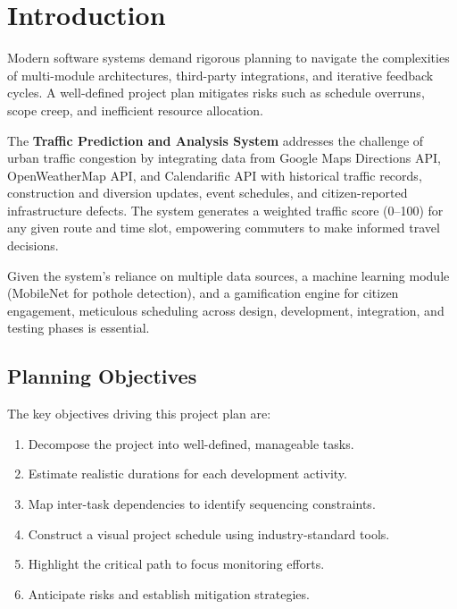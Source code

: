 \documentclass[12pt,a4paper]{article}
\begin{document}
\section{Introduction}
Modern software systems demand rigorous planning to navigate the complexities of multi-module architectures, third-party integrations, and iterative feedback cycles. A well-defined project plan mitigates risks such as schedule overruns, scope creep, and inefficient resource allocation.

The \textbf{Traffic Prediction and Analysis System} addresses the challenge of urban traffic congestion by integrating data from Google Maps Directions API, OpenWeatherMap API, and Calendarific API with historical traffic records, construction and diversion updates, event schedules, and citizen-reported infrastructure defects. The system generates a weighted traffic score (0--100) for any given route and time slot, empowering commuters to make informed travel decisions.

Given the system's reliance on multiple data sources, a machine learning module (MobileNet for pothole detection), and a gamification engine for citizen engagement, meticulous scheduling across design, development, integration, and testing phases is essential.

\subsection{Planning Objectives}
The key objectives driving this project plan are:
\begin{enumerate}[noitemsep, label=\roman*)]
    \item Decompose the project into well-defined, manageable tasks.
    \item Estimate realistic durations for each development activity.
    \item Map inter-task dependencies to identify sequencing constraints.
    \item Construct a visual project schedule using industry-standard tools.
    \item Highlight the critical path to focus monitoring efforts.
    \item Anticipate risks and establish mitigation strategies.
\end{enumerate}

\end{document}
